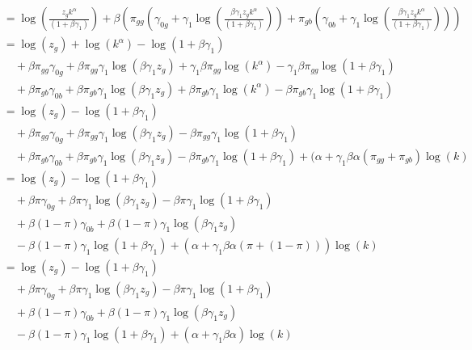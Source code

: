 \documentclass[12pt]{article}
\begin{document}
\begin{enumerate}
\begin{align*}
					     &=\log(\frac{z_g k^{\alpha}  }{(1 + \beta \gamma_1 )}) + \beta ( \pi_{gg} ( \gamma_{0g} + \gamma_1 \log (\frac{\beta \gamma_1z_g k^{\alpha}  }{(1 + \beta \gamma_1 )})) + \pi_{gb}(\gamma_{0b} + \gamma_1 \log (\frac{\beta \gamma_1z_g k^{\alpha}  }{(1 + \beta \gamma_1 )}))) \\
					     &=\log(z_g) + \log( k^{\alpha})  - \log(1 + \beta \gamma_1 ) \\
					     &\quad + \beta \pi_{gg} \gamma_{0g} + \beta \pi_{gg} \gamma_1 \log (\beta \gamma_1z_g) + \gamma_1  \beta \pi_{gg}\log( k^{\alpha}) - \gamma_1 \beta \pi_{gg} \log(1 + \beta \gamma_1 ) \\
					     &\quad + \beta \pi_{gb}\gamma_{0b} + \beta \pi_{gb} \gamma_1 \log (\beta \gamma_1z_g ) + \beta \pi_{gb} \gamma_1 \log(k^{\alpha}) - \beta \pi_{gb} \gamma_1 \log(1 + \beta \gamma_1 ) \\
					     &=\log(z_g)  - \log(1 + \beta \gamma_1 ) \\
					     &\quad + \beta \pi_{gg} \gamma_{0g} + \beta \pi_{gg} \gamma_1 \log (\beta \gamma_1z_g) - \beta \pi_{gg} \gamma_1 \log(1 + \beta \gamma_1 ) \\
					     &\quad + \beta \pi_{gb}\gamma_{0b} + \beta \pi_{gb} \gamma_1 \log (\beta \gamma_1z_g ) - \beta \pi_{gb} \gamma_1 \log(1 + \beta \gamma_1 ) +( \alpha + \gamma_1  \beta \alpha (\pi_{gg}+ \pi_{gb}) \log(k)  \\
					     &=\log(z_g)  - \log(1 + \beta \gamma_1 ) \\
					     &\quad + \beta \pi  \gamma_{0g} + \beta \pi  \gamma_1 \log (\beta \gamma_1z_g) - \beta \pi  \gamma_1 \log(1 + \beta \gamma_1 ) \\
					     &\quad + \beta (1 - \pi) \gamma_{0b} + \beta (1 - \pi)  \gamma_1 \log (\beta \gamma_1z_g ) \\
					     &\quad - \beta (1 - \pi)  \gamma_1 \log(1 + \beta \gamma_1 ) +( \alpha + \gamma_1  \beta \alpha (\pi + (1 - \pi) )) \log(k)  \\
					     &=\log(z_g)  - \log(1 + \beta \gamma_1 ) \\
					     &\quad + \beta \pi  \gamma_{0g} + \beta \pi  \gamma_1 \log (\beta \gamma_1z_g) - \beta \pi  \gamma_1 \log(1 + \beta \gamma_1 ) \\
					     &\quad + \beta (1 - \pi) \gamma_{0b} + \beta (1 - \pi)  \gamma_1 \log (\beta \gamma_1z_g ) \\
					     &\quad - \beta (1 - \pi)  \gamma_1 \log(1 + \beta \gamma_1 ) +( \alpha + \gamma_1  \beta \alpha ) \log(k)  \\

\end{align*}
\end{enumerate}
\end{document}

